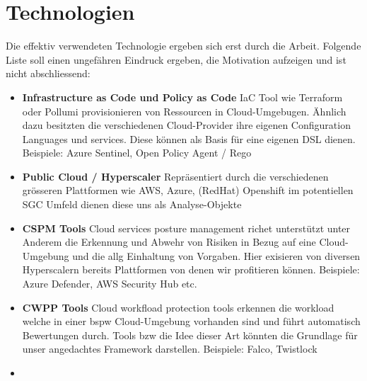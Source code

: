 \section{Technologien}
 
Die effektiv verwendeten Technologie ergeben sich erst durch die Arbeit.
Folgende Liste soll einen ungefähren Eindruck ergeben, die Motivation aufzeigen und ist nicht abschliessend:

\begin{itemize}
    \item \textbf{Infrastructure as Code und Policy as Code} IaC Tool wie Terraform oder Pollumi provisionieren von Ressourcen in Cloud-Umgebugen. Ähnlich dazu besitzten die verschiedenen Cloud-Provider ihre eigenen Configuration Languages und services. Diese können als Basis für eine eigenen DSL dienen. Beispiele: Azure Sentinel, Open Policy Agent / Rego
    \item \textbf{Public Cloud / Hyperscaler} Repräsentiert durch die verschiedenen grösseren Plattformen wie AWS, Azure, (RedHat) Openshift im potentiellen SGC Umfeld dienen diese uns als Analyse-Objekte
    \item \textbf{CSPM Tools} Cloud services posture management richet unterstützt unter Anderem die Erkennung und Abwehr von Risiken in Bezug auf eine Cloud-Umgebung und die allg Einhaltung von Vorgaben. Hier exisieren von diversen Hyperscalern bereits Plattformen von denen wir profitieren können. Beispiele: Azure Defender, AWS Security Hub etc.
    \item  \textbf{CWPP Tools} Cloud workfload protection tools erkennen die workload welche in einer bspw Cloud-Umgebung vorhanden sind und führt automatisch Bewertungen durch. Tools bzw die Idee dieser Art könnten die Grundlage für unser angedachtes Framework darstellen. Beispiele: Falco, Twistlock
    \item \textbf{}
\end{itemize}